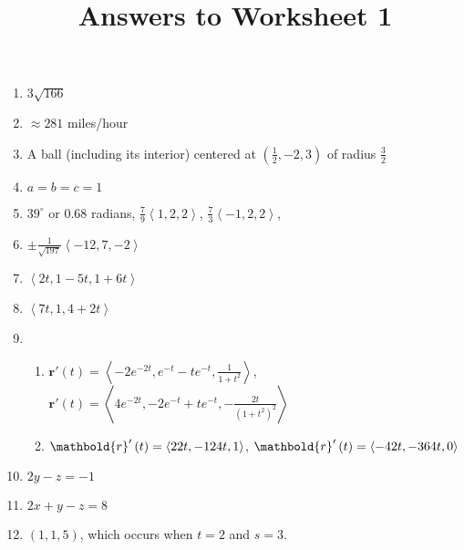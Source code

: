 \documentclass[12pt]{article}
\title{Answers to Worksheet 1}
\author{}\date{}
\let\sin\relax\DeclareMathOperator{\sin}{\mathsf{sin}}
\let\cos\relax\DeclareMathOperator{\cos}{\mathsf{cos}}
\begin{document}
\maketitle
\thispagestyle{empty}

\begin{enumerate}
\item $3\sqrt{166}$
\item $\approx 281$ miles/hour
\item A ball (including its interior)
centered at $\left(\frac{1}{2},-2,3\right)$
of radius $\frac{3}{2}$
\item $a=b=c=1$
\item $39^\circ$ or $0.68$ radians,
$\frac{7}{9}\left\langle 1,2,2\right\rangle$,
$\frac{7}{3}\left\langle -1,2,2\right\rangle$,
\item $\pm\frac{1}{\sqrt{197}}\left\langle -12,7,-2\right\rangle$
\item $\left\langle 2t,1-5t,1+6t\right\rangle$
\item $\left\langle 7t,1,4+2t\right\rangle$
\item\begin{enumerate}
\item $\mathbold{r}'\left(t\right)=
\left\langle -2e^{-2t},e^{-t}-te^{-t},\frac{1}{1+t^2}\right\rangle$,
$\mathbold{r}'\left(t\right)=
\left\langle 4e^{-2t},-2e^{-t}+te^{-t},-\frac{2t}{\left(1+t^2\right)^2}\right\rangle$
\item $\mathbold{r}'\left(t\right)=
\left\langle 2\cos{2t},-12\sin{4t},1\right\rangle$,
$\mathbold{r}'\left(t\right)=
\left\langle -4\sin{2t},-36\cos{4t},0\right\rangle$
\end{enumerate}
\item $2y-z=-1$
\item $2x+y-z=8$
\item $\left(1,1,5\right)$, which occurs when $t=2$ and $s=3$.
\end{enumerate}
\end{document}
